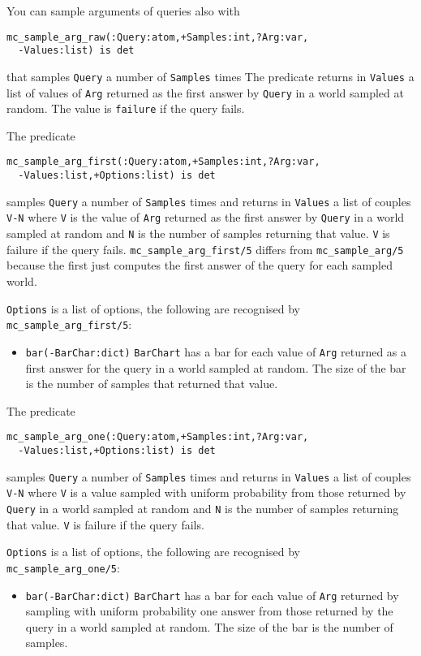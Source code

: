 You can sample arguments of queries also with
\begin{verbatim}
mc_sample_arg_raw(:Query:atom,+Samples:int,?Arg:var,
  -Values:list) is det
\end{verbatim}
that samples \verb|Query| a number of \verb|Samples| times
The predicate returns in \verb|Values| a list of values
of \verb|Arg|  returned as the first answer by \verb|Query|  in
a world sampled at random.
The value is \verb|failure| if the query fails.

The predicate
\begin{verbatim}
mc_sample_arg_first(:Query:atom,+Samples:int,?Arg:var,
  -Values:list,+Options:list) is det
\end{verbatim}
samples \verb|Query| a number of \verb|Samples| times
and returns in \verb|Values| a list of couples \verb|V-N| where
\verb|V| is the value of \verb|Arg| returned as the first answer by \verb|Query| in
a world sampled at random and \verb|N| is the number of samples
returning that value.
\verb|V| is failure if the query fails.
\verb|mc_sample_arg_first/5| differs from \verb|mc_sample_arg/5| because the first just computes the first
answer of the query for each sampled world.

\verb|Options| is a list of options, the following are recognised by \verb|mc_sample_arg_first/5|:
\begin{itemize}
\item \verb|bar(-BarChar:dict)|
  \verb|BarChart| has a bar for each value of \verb|Arg| returned as a first answer for the query in
   a world sampled at random.
   The size of the bar is the number of samples that returned that value.
\end{itemize}

The predicate
\begin{verbatim}
mc_sample_arg_one(:Query:atom,+Samples:int,?Arg:var,
  -Values:list,+Options:list) is det
\end{verbatim}
 samples \verb|Query| a number of \verb|Samples| times
and returns in \verb|Values| a list of couples \verb|V-N| where
\verb|V| is a value sampled with uniform probability from those returned
by \verb|Query| in a world sampled at random and \verb|N| is the number of samples
returning that value.
\verb|V| is failure if the query fails.

\verb|Options| is a list of options, the following are recognised by \verb|mc_sample_arg_one/5|:
\begin{itemize}
\item \verb|bar(-BarChar:dict)|
\verb|BarChart| has a bar for each value of \verb|Arg| returned by sampling with uniform
    probability one answer from those returned by the query in a world sampled
    at random.
    The size of the bar is the number of samples.
\end{itemize}


